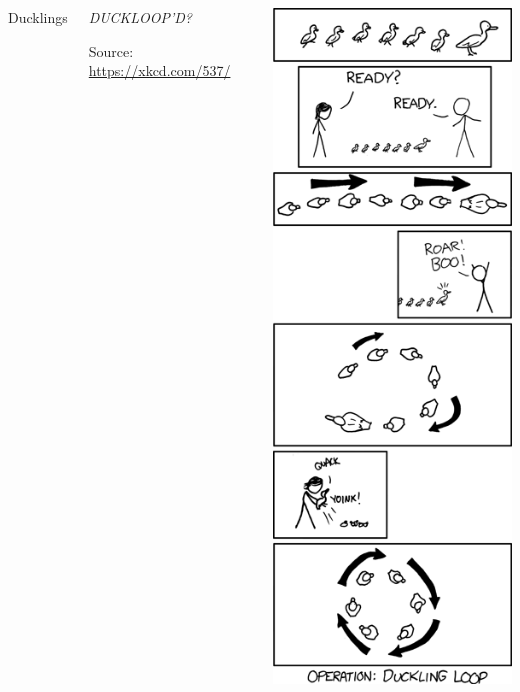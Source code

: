 
\begin{frame}%
%
\begin{columns}[T]
\begin{Large}
	{Ducklings}
\end{Large}
%
\begin{center}
	\vspace{60pt}
	\emph{DUCKLOOP'D?}

	\vspace{6pt}
	Source: \url{https://xkcd.com/537/}
\end{center}
%
\begin{center}
	\includegraphics[width=.38\linewidth]{./gfx/ducklings}\\
\end{center}
\end{columns}

%
\end{frame}


